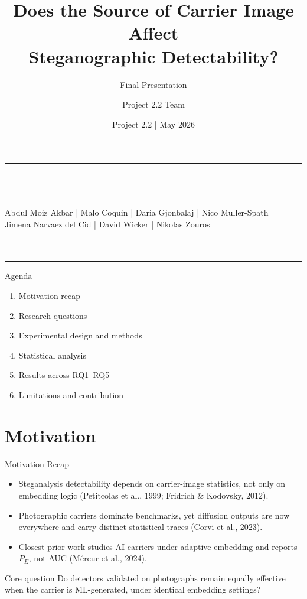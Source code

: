 \documentclass[aspectratio=169,11pt]{beamer}
\title{Does the Source of Carrier Image Affect\\Steganographic Detectability?}
\subtitle{Final Presentation}
\author[Project 2.2 Team]{Project 2.2 Team}
\institute{Department of Advanced Computing Sciences\\Maastricht University}
\date{Project 2.2 \;|\; May 2026}
\newcommand{\icite}[1]{{\footnotesize\color{umgray!85}#1}}
\newcommand{\teamauthors}{Abdul Moiz Akbar \;|\; Malo Coquin \;|\; Daria Gjonbalaj \;|\; Nico Muller-Spath\\Jimena Narvaez del Cid \;|\; David Wicker \;|\; Nikolas Zouros}
\begin{document}
\begin{frame}[plain]
\vfill
\begin{center}
{\color{umorange}\rule{0.42\textwidth}{2pt}}\\[12pt]
{\LARGE\bfseries\color{umdark}\inserttitle}\\[10pt]
{\normalsize\color{umgray}\insertsubtitle}\\[16pt]
{\small\color{umdark}\teamauthors}\\[8pt]
{\small\color{umorange}\insertinstitute}\\[8pt]
{\footnotesize\color{umgray}\insertdate}\\[12pt]
{\color{umorange}\rule{0.42\textwidth}{2pt}}
\end{center}
\vfill
\end{frame}

\begin{frame}{Agenda}
\small
\begin{enumerate}
\item Motivation recap
\item Research questions
\item Experimental design and methods
\item Statistical analysis
\item Results across RQ1--RQ5
\item Limitations and contribution
\end{enumerate}
\end{frame}

\section{Motivation}
\begin{frame}{Motivation Recap}
\small
\begin{itemize}
\item Steganalysis detectability depends on carrier-image statistics, not only on embedding logic \icite{(Petitcolas et al., 1999; Fridrich \& Kodovsky, 2012).}
\item Photographic carriers dominate benchmarks, yet diffusion outputs are now everywhere and carry distinct statistical traces \icite{(Corvi et al., 2023).}
\item Closest prior work studies AI carriers under adaptive embedding and reports $P_E$, not AUC \icite{(M\'ereur et al., 2024).}
\end{itemize}
\vspace{0.1cm}
\begin{alertblock}{Core question}
Do detectors validated on photographs remain equally effective when the carrier is ML-generated, under identical embedding settings?
\end{alertblock}
\end{frame}
\end{document}
